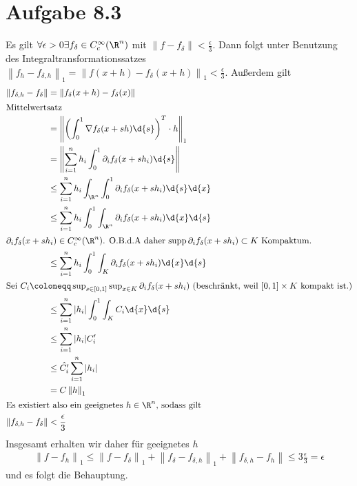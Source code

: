 \documentclass{article}
\newcommand{\norm}[1]{\left\lVert #1 \right\rVert}
\begin{document}
    \section*{Aufgabe 8.3}
    Es gilt $\forall \epsilon > 0 \exists f_\delta \in C_c^\infty(\R^n)$ mit $\norm{f - f_\delta} < \frac{\epsilon}{3}$.
    Dann folgt unter Benutzung des Integraltransformationssatzes $\norm{f_h - f_{\delta, h}}_1 = \norm{f(x + h) - f_\delta(x+h)}_1 < \frac{\epsilon}{3}$.
    Außerdem gilt
    \begin{align*}
        \norm{f_{\delta, h} - f_\delta} &= \norm{f_\delta(x + h) - f_\delta(x)}\\
        \intertext{Mittelwertsatz}
        &= \norm{\left(\int_0^1 \nabla f_\delta(x + sh) \d{s}\right)^T \cdot h}_1\\
        &= \norm{\sum_{i = 1}^{n} h_i \int_0^1 \partial_i f_\delta(x + sh_i) \d{s}}\\
        &\leq \sum_{i = 1}^{n} h_i \int_{\R^n} \int_0^1 \partial_i f_\delta(x + sh_i) \d{s} \d{x}\\    
        &\leq \sum_{i = 1}^{n} h_i  \int_0^1 \int_{\R^n} \partial_i f_\delta(x + sh_i) \d{x} \d{s}\\
        \intertext{$\partial_i f_\delta(x + sh_i) \in C_c^\infty(\R^n)$. O.B.d.A daher $\operatorname{supp} \partial_i f_\delta(x + sh_i) \subset K$ Kompaktum.}
        &\leq \sum_{i = 1}^{n} h_i \int_0^1 \int_K \partial_i f_\delta(x + sh_i) \d{x} \d{s}\\
        \intertext{Sei $C_i \coloneqq \sup_{s\in [0,1]} \sup_{x\in K} \partial_i f_\delta(x + sh_i)$ (beschränkt, weil $[0,1] \times K$ kompakt ist.)}
        &\leq \sum_{i = 1}^{n} |h_i| \int_0^1 \int_K C_i \d{x}\d{s}\\
        &\leq \sum_{i = 1}^{n} |h_i| C_i'\\
        &\leq \hat{C_i'} \sum_{i = 1}^{n} |h_i|\\
        &= C \norm{h}_1\\
        \intertext{Es existiert also ein geeignetes $h \in \R^n$, sodass gilt}
        \norm{f_{\delta, h} - f_\delta} &< \frac{\epsilon}{3}
    \end{align*}
    Insgesamt erhalten wir daher für geeignetes $h$
    \begin{align*}
        \norm{f - f_h}_1 \leq \norm{f - f_\delta}_1 + \norm{f_\delta - f_{\delta, h}}_1 + \norm{f_{\delta, h} - f_h} \leq 3 \frac{\epsilon}{3} = \epsilon
    \end{align*}
    und es folgt die Behauptung.
\end{document}
